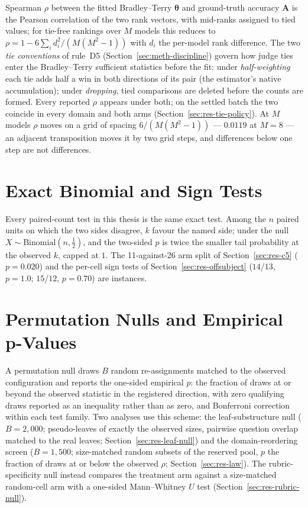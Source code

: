 Spearman $\rho$ between the fitted Bradley--Terry $\boldsymbol{\theta}$ and
ground-truth accuracy $\mathbf{A}$ is the Pearson correlation of the two rank vectors,
with mid-ranks assigned to tied values; for tie-free rankings over $M$ models this
reduces to $\rho = 1 - 6\sum_i d_i^2 / (M(M^2-1))$ with $d_i$ the per-model rank
difference. The two \emph{tie conventions} of rule~D5
(Section~\ref{sec:meth-discipline}) govern how judge ties enter the Bradley--Terry
sufficient statistics before the fit: under \emph{half-weighting} each tie adds half a
win in both directions of its pair (the estimator's native accumulation); under
\emph{dropping}, tied comparisons are deleted before the counts are formed. Every
reported $\rho$ appears under both; on the settled batch the two coincide in every
domain and both arms (Section~\ref{sec:res-tie-policy}). At $M$ models $\rho$ moves on
a grid of spacing $6/(M(M^2-1))$ --- $0.0119$ at $M = 8$ --- an adjacent transposition
moves it by two grid steps, and differences below one step are not differences.

\section{Exact Binomial and Sign Tests}\label{sec:app-metrics-binomial}

Every paired-count test in this thesis is the same exact test. Among the $n$ paired
units on which the two sides disagree, $k$ favour the named side; under the null
$X \sim \mathrm{Binomial}(n, \tfrac{1}{2})$, and the two-sided $p$ is twice the
smaller tail probability at the observed $k$, capped at $1$. The 11-against-26 arm
split of Section~\ref{sec:res-c5} ($p = 0.020$) and the per-cell sign tests of
Section~\ref{sec:res-offsubject} ($14$/$13$, $p = 1.0$; $15$/$12$, $p = 0.70$) are
instances.

\section{Permutation Nulls and Empirical p-Values}\label{sec:app-metrics-permutation}

A permutation null draws $B$ random re-assignments matched to the observed
configuration and reports the one-sided empirical $p$: the fraction of draws at or
beyond the observed statistic in the registered direction, with zero qualifying draws
reported as an inequality rather than as zero, and Bonferroni correction within each
test family. Two analyses use this scheme: the leaf-substructure null ($B = 2{,}000$;
pseudo-leaves of exactly the observed sizes, pairwise question overlap matched to the
real leaves; Section~\ref{sec:res-leaf-null}) and the domain-reordering screen
($B = 1{,}500$; size-matched random subsets of the reserved pool, $p$ the fraction of
draws at or below the observed $\rho$; Section~\ref{sec:res-law}). The
rubric-specificity null instead compares the treatment arm against a size-matched
random-cell arm with a one-sided Mann--Whitney $U$ test
(Section~\ref{sec:res-rubric-null}).


